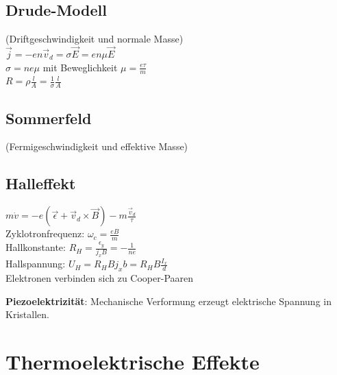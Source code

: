 \documentclass[fs, footer]{latex4ei}
\begin{document}
\begin{multicols*}{4}
{		\subsection{Drude-Modell}
		(Driftgeschwindigkeit und normale Masse)\\
		$\vec j = -en\vec v_d = \sigma\vec E = en\mu\vec E$\\
		$\sigma = ne\mu$ mit Beweglichkeit $\mu = \frac{e\tau}{m}$\\
		$R = \rho \frac{l}{A} = \frac{1}{\sigma} \frac{l}{A}$ 
		
		\subsection{Sommerfeld}
		(Fermigeschwindigkeit und effektive Masse)\\
		
		\subsection{Halleffekt}
		$m\dot v = -e(\vec \epsilon + \vec v_d \times \vec B) - m \frac{\vec v_d}{\tau}$\\
		Zyklotronfrequenz: $\omega_c = \frac{eB}{m}$\\
		Hallkonstante: $R_H = \frac{\epsilon_y}{j_xB} = -\frac{1}{ne}$\\
		Hallspannung: $U_H = R_HBj_xb = R_HB\frac{I_x}{d}$\\

		Elektronen verbinden sich zu Cooper-Paaren

	}		
				
		\textbf{Piezoelektrizität}: Mechanische Verformung erzeugt elektrische Spannung in Kristallen.\\

\section{Thermoelektrische Effekte}
\end{multicols*}
\end{document}
